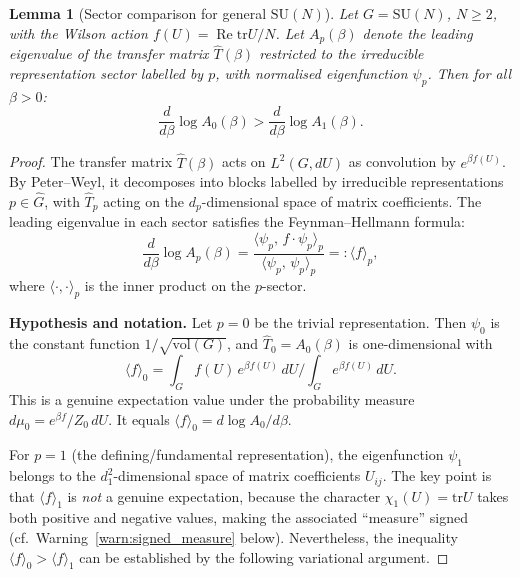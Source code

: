 \documentclass[12pt]{article}
\newtheorem{lemma}[theorem]{Lemma}
\theoremstyle{definition}
\theoremstyle{remark}
\newcommand{\SU}{\mathrm{SU}}
\newcommand{\tr}{\mathrm{tr}}
\newcommand{\re}{\operatorname{Re}}
\begin{document}
\begin{lemma}[Sector comparison for general $\SU(N)$]
\label{lem:sector_comparison}
Let $G = \SU(N)$, $N \ge 2$, with the Wilson action
$f(U) = \re\tr U/N$.  Let $A_p(\beta)$ denote the leading
eigenvalue of the transfer matrix $\hat{T}(\beta)$ restricted to
the irreducible representation sector labelled by $p$, with
normalised eigenfunction $\psi_p$.  Then for all $\beta > 0$:
\begin{equation}\label{eq:sector_ineq}
\frac{d}{d\beta}\log A_0(\beta) > \frac{d}{d\beta}\log A_1(\beta).
\end{equation}
\end{lemma}

\begin{proof}
The transfer matrix $\hat{T}(\beta)$ acts on $L^2(G, dU)$ as
convolution by $e^{\beta f(U)}$.  By Peter--Weyl, it decomposes into
blocks labelled by irreducible representations $p \in \widehat{G}$,
with $\hat{T}_p$ acting on the $d_p$-dimensional space of matrix
coefficients.  The leading eigenvalue in each sector satisfies the
Feynman--Hellmann formula:
\begin{equation}\label{eq:fh}
\frac{d}{d\beta}\log A_p(\beta)
= \frac{\langle \psi_p,\, f \cdot \psi_p \rangle_p}
       {\langle \psi_p,\, \psi_p \rangle_p}
=: \langle f \rangle_p,
\end{equation}
where $\langle\cdot,\cdot\rangle_p$ is the inner product on the
$p$-sector.

\textbf{Hypothesis and notation.}
Let $p = 0$ be the trivial representation.  Then $\psi_0$ is the
constant function $1/\sqrt{\mathrm{vol}(G)}$, and
$\hat{T}_0 = A_0(\beta)$ is one-dimensional with
\begin{equation}
\langle f \rangle_0
= \int_G f(U)\,e^{\beta f(U)}\,dU \Big/ \int_G e^{\beta f(U)}\,dU.
\end{equation}
This is a genuine expectation value under the probability measure
$d\mu_0 = e^{\beta f}/Z_0\,dU$.  It equals
$\langle f \rangle_0 = d\log A_0/d\beta$.

For $p = 1$ (the defining/fundamental representation), the
eigenfunction $\psi_1$ belongs to the $d_1^2$-dimensional
space of matrix coefficients $U_{ij}$.  The key point is
that $\langle f \rangle_1$ is \emph{not} a genuine expectation,
because the character $\chi_1(U) = \tr U$ takes both positive and
negative values, making the associated ``measure'' signed
(cf.\ Warning~\ref{warn:signed_measure} below).  Nevertheless,
the inequality $\langle f \rangle_0 > \langle f \rangle_1$ can be
established by the following variational argument.


\end{proof}
\end{document}
